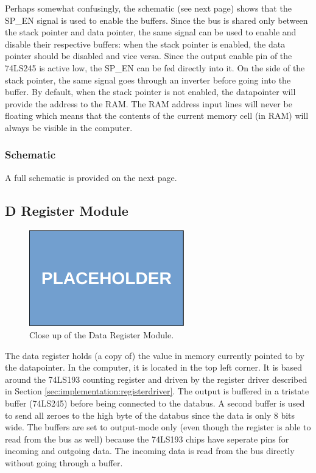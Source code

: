 Perhaps somewhat confusingly, the schematic (see next page) shows that the SP\_EN signal is used to enable the buffers. Since the bus is shared only between the stack pointer and data pointer, the same signal can be used to enable and disable their respective buffers: when the stack pointer is enabled, the data pointer should be disabled and vice versa. Since the output enable pin of the 74LS245 is active low, the SP\_EN can be fed directly into it. On the side of the stack pointer, the same signal goes through an inverter before going into the buffer. By default, when the stack pointer is not enabled, the datapointer will provide the address to the RAM. The RAM address input lines will never be floating which means that the contents of the current memory cell (in RAM) will always be visible in the computer.


\subsubsection{Schematic}
A full schematic is provided on the next page.




\subsection{D Register Module}
\begin{figure}[H]
  \centering
  \includegraphics[width=0.6\textwidth]{img/placeholder}
  \caption{Close up of the Data Register Module.}
  \label{fig:dregcloseup}
\end{figure}

The data register holds (a copy of) the value in memory currently pointed to by the datapointer. In the computer, it is located in the top left corner. It is based around the 74LS193 counting register and driven by the register driver described in Section \ref{sec:implementation:registerdriver}. The output is buffered in a tristate buffer (74LS245) before being connected to the databus. A second buffer is used to send all zeroes to the high byte of the databus since the data is only 8 bits wide. The buffers are set to output-mode only (even though the register is able to read from the bus as well) because the 74LS193 chips have seperate pins for incoming and outgoing data. The incoming data is read from the bus directly without going through a buffer.

